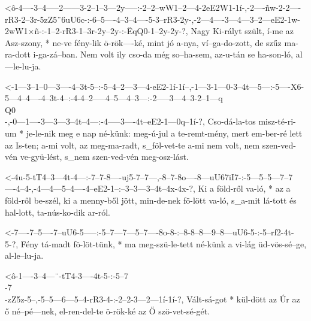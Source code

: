
  {<ô-4----3--4-----2------3-2--1--3---2y-----:-2--2--wW1--2---4-2eE2W1-1í-,-2----ñw-2-2----rR3-2--3r-5zZ5¨6uU6c-:-6--5----4--3--4----5-3--rR3-2y-,-2---4----3---4---3--2---eE2-1w-2wW1×ñ-:-1--2-rR3-1--3r-2y--2y-:-ËqQ0-1--2y-2y-?,}
  {   Nagy Ki-rályt szült, í-me az Asz-szony, * ne-ve fény-lik ö-rök----ké,  mint jó a-nya, ví--ga-do-zott,        de szűz ma-ra-dott i-ga-zá--ban. Nem volt ily cso-da még so--ha-sem,     az-u-tán se ha-son-ló,  al---le-lu-ja.}

  {<-1---3--1--0---3----4--3t-5--:-5--4--2---3---4-eE2-1í-1í--,-1---3-1---0-3--4t---5---:-5----X6-5---4--4----4--3t-4--:-4-4--2-----4--5---4--3---:-2-----3---4--3-2--1---q\\Q0\\-,-0---1----3---3---3--4t--4---:-4-----3----4t--eE2-1---0q--1í-?,}
  {  Cso-dá-la-tos misz-té-ri-um * je-le-nik meg e nap né-künk: meg-ú-jul a te-remt-mény, mert em-ber-ré lett az Is-ten; a-mi volt, az meg-ma-radt, s_föl-vet-te a-mi nem volt,     nem szen-ved-vén ve-gyü-lést, s_nem szen-ved-vén meg-osz-lást.}



  {<-4u-5-tT4--3---4t-4---:-7--7-8----uj5-7--7---,-8--7-8o----8---uU67iI7-:-5---5--5---7--7----4--4-,-4---4---5--4----4--eE2-1--:--3--3---3--4t--4x-4x-?,}
  {  Ki a föld-ről va-ló, * az a föld-ről be-szél, ki a menny-ből jött,     min-de-nek fö-lött va-ló, s_a-mit lá-tott és hal-lott, ta-nús-ko-dik ar-ról.}


  {<-7----7--5----7--uU6-5-----:-5--7---7---5--7----8o-8-:--8-8--8---9--8---uU6-5-:-5--rf2-4t-5-?,}
  {  Fény tá-madt fö-löt-tünk, * ma meg-szü-le-tett né-künk a vi-lág üd-vös-sé--ge, al-le--lu-ja.}


  {<ô-1----3--4---¨-tT4-3----4t-5-:-5--7\\-7\\-zZ5z-5--,-5--5---6---5--4-rR3-4-:-2--2-3---2---1í-1í-?,}
  {   Vált-sá-got * kül-dött az Úr  az ő   né--pé---nek, el-ren-del-te ö-rök-ké  az Ő szö-vet-sé-gét.}

